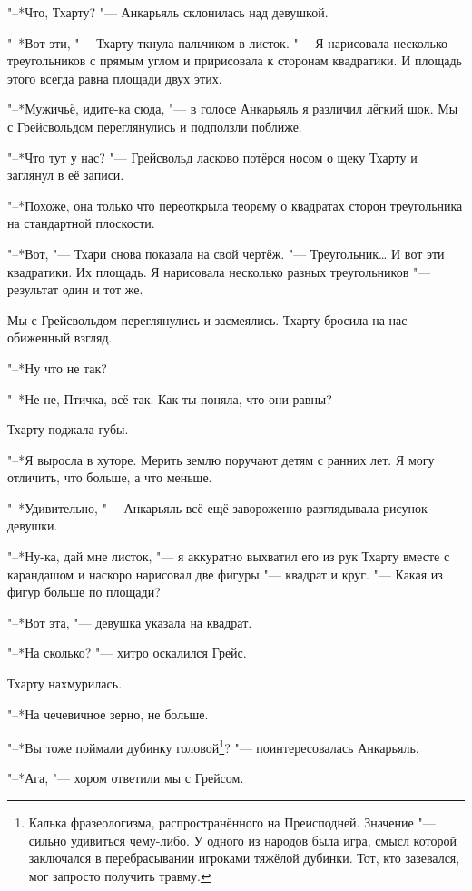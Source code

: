 \documentclass[a4paper,10pt]{book}
\newcommand{\ldotst}{\so{...}\xspace}
\begin{document}
"--*Что, Тхарту? "--- Анкарьяль склонилась над девушкой.

"--*Вот эти, "--- Тхарту ткнула пальчиком в листок. "--- Я нарисовала несколько 
треугольников с\ldotst прямым углом и пририсовала к сторонам квадратики. И 
площадь этого всегда равна площади двух этих.

"--*Мужичьё, идите-ка сюда, "--- в голосе Анкарьяль я различил лёгкий шок. Мы с 
Грейсвольдом переглянулись и подползли поближе.

"--*Что тут у нас? "--- Грейсвольд ласково потёрся носом о щеку Тхарту и 
заглянул в её записи.

"--*Похоже, она только что переоткрыла теорему о квадратах сторон треугольника 
на стандартной плоскости.

"--*Вот, "--- Тхари снова показала на свой чертёж. "--- Треугольник… И вот эти 
квадратики. Их площадь. Я нарисовала несколько разных треугольников "--- 
результат один и тот же.

Мы с Грейсвольдом переглянулись и засмеялись. Тхарту бросила на нас обиженный 
взгляд.

"--*Ну что не так?

"--*Не-не, Птичка, всё так. Как ты поняла, что они равны?

Тхарту поджала губы.

"--*Я выросла в хуторе. Мерить землю поручают детям с ранних лет. Я могу 
отличить, что больше, а что меньше.

"--*Удивительно, "--- Анкарьяль всё ещё завороженно разглядывала рисунок 
девушки.

"--*Ну-ка, дай мне листок, "--- я аккуратно выхватил его из рук Тхарту вместе с 
карандашом и наскоро нарисовал две фигуры "--- квадрат и круг. "--- Какая из 
фигур больше по площади?

"--*Вот эта, "--- девушка указала на квадрат.

"--*На сколько? "--- хитро оскалился Грейс.

Тхарту нахмурилась.

"--*На чечевичное зерно, не больше.

"--*Вы тоже поймали дубинку головой\footnote{Калька фразеологизма, 
распространённого на Преисподней. Значение "--- сильно удивиться чему-либо. У 
одного из народов была игра, смысл которой заключался в перебрасывании игроками 
тяжёлой дубинки. Тот, кто зазевался, мог запросто получить травму.}? "--- 
поинтересовалась Анкарьяль.

"--*Ага, "--- хором ответили мы с Грейсом.
\end{document}
